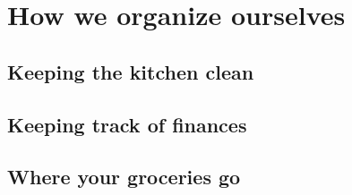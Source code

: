 \chapter{How we organize ourselves} \label{chap:organization}

\section{Keeping the kitchen clean}

\section{Keeping track of finances}

\section{Where your groceries go}